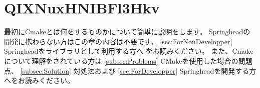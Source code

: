 \newpage
\section{QIXNuxHNIBFl3Hkv}
\label{sec:WhatCMakeWillDo}

\noindent
\KLUDGE 最初にCmake\KLUDGE とは何をするものかについて簡単に説明をします。
Springhead\KLUDGE の開発に携わらない方はこの章の内容は不要です。
\KQuoteS \ref{sec:ForNonDevelopper} Springhead\KLUDGE をライブラリとして利用する方へ\KQuoteE
\KLUDGE をお読みください。
\KLUDGE また、Cmake\KLUDGE について理解をされている方は
\KQuoteS \ref{subsec:Problems} CMake\KLUDGE を使用した場合の問題点\KQuoteE\KLUDGE 、
\KQuoteS \ref{subsec:Solution} \KLUDGE 対処法\KQuoteE \KLUDGE および
\KQuoteS \ref{sec:ForDevelopper} Springhead\KLUDGE を開発する方へ\KQuoteE \KLUDGE をお読みください。

